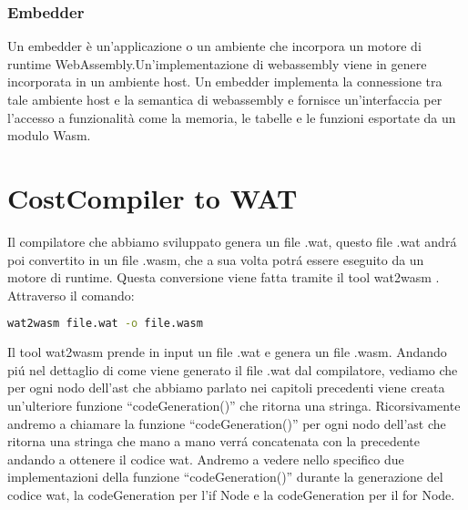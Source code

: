 \documentclass[../../main.tex]{subfiles}
\begin{document}
\subsubsection{Embedder}
Un embedder è un'applicazione o un ambiente che incorpora un motore di runtime WebAssembly.Un'implementazione di webassembly viene in genere incorporata in un ambiente host.
Un embedder implementa la connessione tra tale ambiente host e la semantica di webassembly e fornisce un'interfaccia per l'accesso a funzionalità come la memoria, le tabelle e le funzioni esportate da un modulo Wasm.\cite{amslaurea20464}\cite{DBLP:journals/corr/abs-2205-01183}

\section{CostCompiler to WAT}
Il compilatore che abbiamo sviluppato genera un file .wat, questo file .wat andrá poi convertito in un file .wasm, che a sua volta potrá essere eseguito da un motore di runtime.
Questa conversione viene fatta tramite il tool wat2wasm \cite{jain2022webassembly}.
Attraverso il comando:
\begin{lstlisting}[language=bash]
    wat2wasm file.wat -o file.wasm
\end{lstlisting}
Il tool wat2wasm prende in input un file .wat e genera un file .wasm.
Andando piú nel dettaglio di come viene generato il file .wat dal compilatore, vediamo che per ogni nodo dell'ast che abbiamo parlato nei capitoli precedenti viene creata un'ulteriore funzione ``codeGeneration()'' che ritorna una stringa.
Ricorsivamente andremo a chiamare la funzione ``codeGeneration()'' per ogni nodo dell'ast che ritorna una stringa che mano a mano verrá concatenata con la precedente andando a ottenere il codice wat.
Andremo a vedere nello specifico due implementazioni della funzione ``codeGeneration()'' durante la generazione del codice wat, la codeGeneration per l'if Node e la codeGeneration per il for Node.
\end{document}
